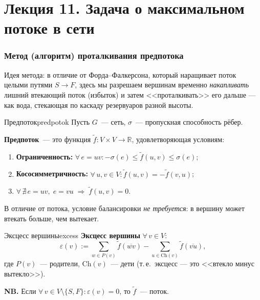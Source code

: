 
\chapter{Лекция 11. Задача о максимальном потоке в сети}

\subsection*{Метод (алгоритм) проталкивания предпотока}

Идея метода: в отличие от Форда--Фалкерсона, который наращивает поток
целыми путями $S \to F$, здесь мы разрешаем вершинам временно
\emph{накапливать} лишний втекающий поток (избыток) и затем
<<проталкивать>> его дальше --- как вода, стекающая по каскаду
резервуаров разной высоты.

\begin{defn}{Предпоток}{predpotok}
Пусть $G$~--- сеть, $\sigma$~--- пропускная способность рёбер.

\textbf{Предпоток}~--- это функция $\tilde{f}\colon V \times V \to \mathbb{R}$, удовлетворяющая условиям:
\begin{enumerate}
  \item \textbf{Ограниченность:} $\forall\, e = uv\colon -\sigma(e) \le \tilde{f}(u,v) \le \sigma(e)$;
  \item \textbf{Кососимметричность:} $\forall\, u,v \in V\colon \tilde{f}(u,v) = -\tilde{f}(v,u)$;
  \item $\forall\, \nexists\, e = uv,\; e = vu \;\Rightarrow\; \tilde{f}(u,v) = 0$.
\end{enumerate}
В отличие от потока, условие балансировки \emph{не требуется}: в вершину
может втекать больше, чем вытекает.
\end{defn}

\begin{defn}{Эксцесс вершины}{excess}
\textbf{Эксцесс вершины} $\forall\, v \in V$:
\[
  \varepsilon(v) := \sum_{w \in P(v)} \tilde{f}(\overline{wv}) - \sum_{u \in \mathrm{Ch}(v)} \tilde{f}(\overline{vu}),
\]
где $P(v)$~--- родители, $\mathrm{Ch}(v)$~--- дети
(т.\,е.\ эксцесс --- это <<втекло минус вытекло>>).
\end{defn}

\textbf{NB.} Если $\forall\, v \in V \setminus \{S, F\}\colon \varepsilon(v) = 0$, то $\tilde{f}$~--- поток.


